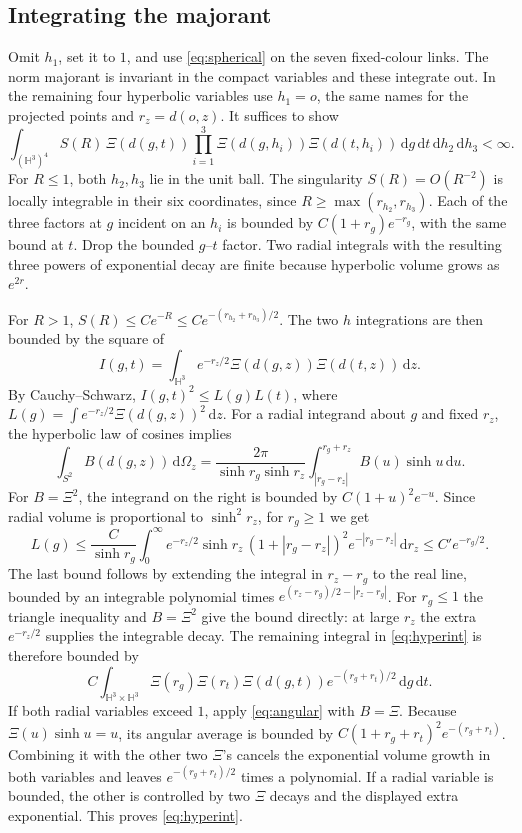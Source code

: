 \documentclass[11pt]{article}
\theoremstyle{remark}
\newcommand{\Hh}{\mathbb H^3}
\newcommand{\dd}{\mathrm d}
\begin{document}
\subsection{Integrating the majorant}
Omit \(h_1\), set it to \(1\), and use \eqref{eq:spherical} on the seven fixed-colour links. The norm majorant is invariant in the compact variables and these integrate out. In the remaining four hyperbolic variables use \(h_1=o\), the same names for the projected points and \(r_z=d(o,z)\). It suffices to show
\begin{equation}\label{eq:hyperint}
 \int_{(\Hh)^4} S(R)\,\Xi(d(g,t))
 \prod_{i=1}^3\Xi(d(g,h_i))\Xi(d(t,h_i))\,\dd g\,\dd t\,\dd h_2\,\dd h_3
 <\infty .
\end{equation}
For \(R\le1\), both \(h_2,h_3\) lie in the unit ball. The singularity \(S(R)=O(R^{-2})\) is locally integrable in their six coordinates, since \(R\ge\max(r_{h_2},r_{h_3})\). Each of the three factors at \(g\) incident on an \(h_i\) is bounded by \(C(1+r_g)e^{-r_g}\), with the same bound at \(t\). Drop the bounded \(g\)--\(t\) factor. Two radial integrals with the resulting three powers of exponential decay are finite because hyperbolic volume grows as \(e^{2r}\).

For \(R>1\), \(S(R)\le C e^{-R}\le C e^{-(r_{h_2}+r_{h_3})/2}\). The two \(h\) integrations are then bounded by the square of
\[
 I(g,t)=\int_{\Hh} e^{-r_z/2}\Xi(d(g,z))\Xi(d(t,z))\,\dd z .
\]
By Cauchy--Schwarz, \(I(g,t)^2\le L(g)L(t)\), where
\(L(g)=\int e^{-r_z/2}\Xi(d(g,z))^2\,\dd z\). For a radial integrand about \(g\) and fixed \(r_z\), the hyperbolic law of cosines implies
\begin{equation}\label{eq:angular}
 \int_{S^2}B(d(g,z))\,\dd\Omega_z
 =\frac{2\pi}{\sinh r_g\sinh r_z}
   \int_{|r_g-r_z|}^{r_g+r_z} B(u)\sinh u\,\dd u .
\end{equation}
For \(B=\Xi^2\), the integrand on the right is bounded by \(C(1+u)^2e^{-u}\). Since radial volume is proportional to \(\sinh^2r_z\), for \(r_g\ge1\) we get
\[
 L(g)\le \frac{C}{\sinh r_g}
 \int_0^\infty e^{-r_z/2}\sinh r_z\,
 (1+|r_g-r_z|)^2e^{-|r_g-r_z|}\,\dd r_z
 \le C'e^{-r_g/2}.
\]
The last bound follows by extending the integral in \(r_z-r_g\) to the real line, bounded by an integrable polynomial times \(e^{(r_z-r_g)/2-|r_z-r_g|}\). For \(r_g\le1\) the triangle inequality and \(B=\Xi^2\) give the bound directly: at large \(r_z\) the extra \(e^{-r_z/2}\) supplies the integrable decay. The remaining integral in \eqref{eq:hyperint} is therefore bounded by
\[
 C\int_{\Hh\times\Hh}\Xi(r_g)\Xi(r_t)\Xi(d(g,t))e^{-(r_g+r_t)/2}\,\dd g\,\dd t .
\]
If both radial variables exceed \(1\), apply \eqref{eq:angular} with \(B=\Xi\). Because \(\Xi(u)\sinh u=u\), its angular average is bounded by \(C(1+r_g+r_t)^2e^{-(r_g+r_t)}\). Combining it with the other two \(\Xi\)'s cancels the exponential volume growth in both variables and leaves \(e^{-(r_g+r_t)/2}\) times a polynomial. If a radial variable is bounded, the other is controlled by two \(\Xi\) decays and the displayed extra exponential. This proves \eqref{eq:hyperint}.
\end{document}
